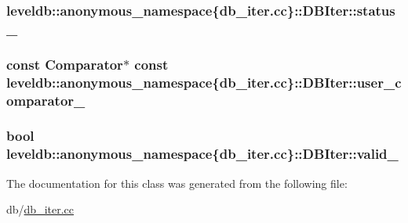 \subsubsection[{status\+\_\+}]{ leveldb\+::anonymous\+\_\+namespace\{db\+\_\+iter.\+cc\}\+::D\+B\+Iter\+::status\+\_\+\hspace{0.3cm}{\ttfamily [private]}}\label{classleveldb_1_1anonymous__namespace_02db__iter_8cc_03_1_1_d_b_iter_a96aeebf50536a2cc97a5cae63256fdc0}
\hypertarget{classleveldb_1_1anonymous__namespace_02db__iter_8cc_03_1_1_d_b_iter_a235c988747c2c2259c9de66a9950496e}{}
\subsubsection[{user\+\_\+comparator\+\_\+}]{\setlength{\rightskip}{0pt plus 5cm}const {\bf Comparator}$\ast$ const leveldb\+::anonymous\+\_\+namespace\{db\+\_\+iter.\+cc\}\+::D\+B\+Iter\+::user\+\_\+comparator\+\_\+\hspace{0.3cm}{\ttfamily [private]}}\label{classleveldb_1_1anonymous__namespace_02db__iter_8cc_03_1_1_d_b_iter_a235c988747c2c2259c9de66a9950496e}
\hypertarget{classleveldb_1_1anonymous__namespace_02db__iter_8cc_03_1_1_d_b_iter_a647dfc231e50cc8d7b67e46ff66b47b1}{}
\subsubsection[{valid\+\_\+}]{\setlength{\rightskip}{0pt plus 5cm}bool leveldb\+::anonymous\+\_\+namespace\{db\+\_\+iter.\+cc\}\+::D\+B\+Iter\+::valid\+\_\+\hspace{0.3cm}{\ttfamily [private]}}\label{classleveldb_1_1anonymous__namespace_02db__iter_8cc_03_1_1_d_b_iter_a647dfc231e50cc8d7b67e46ff66b47b1}


The documentation for this class was generated from the following file\+:\begin{DoxyCompactItemize}
\item 
db/\hyperlink{db__iter_8cc}{db\+\_\+iter.\+cc}\end{DoxyCompactItemize}
